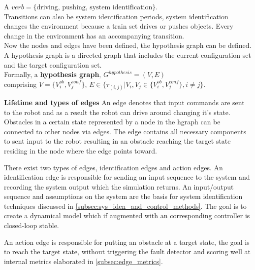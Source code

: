 A $verb = \{\textrm{driving, pushing, system identification}\}$.\\

Transitions can also be system identification periods, system identification changes the environment because a train set drives or pushes objects. Every change in the environment has an accompanying transition.\\

Now the nodes and edges have been defined, the hypothesis graph can be defined. A hypothesis graph is a directed graph that includes the current configuration set and the target configuration set. \\
Formally, a \textbf{hypothesis graph}, $G^{hypothesis} = (V, E)$ 
\\comprising $V = \{V^{ob}_{i}, V^{conf}_{j}\}$, $E \in \{\tau_{(i,j)}| V_i, V_j \in \{V^{ob}_{i}, V^{conf}_{j}\}, i \neq j\}$.\\





\textbf{Lifetime and types of edges}
\newline
An edge denotes that input commands are sent to the robot and as a result the robot can drive around changing it's state. Obstacles in a certain state represented by a node in the hgraph can be connected to other nodes via edges.
The edge contains all necessary components to sent input to the robot resulting in an obstacle reaching the target state residing in the node where the edge points toward. \vspace{\baselineskip}

There exist two types of edges, identification edges and action edges. An identification edge is responsible for sending an input sequence to the system and recording the system output which the simulation returns. An input/output sequence and assumptions on the system are the basis for system identification techniques discussed in \cref{subsec:sys_iden_and_control_methods}. The goal is to create a dynamical model which if augmented with an corresponding controller is closed-loop stable. \vspace{\baselineskip}

An action edge is responsible for putting an obstacle at a target state, the goal is to reach the target state, without triggering the fault detector and scoring well at internal metrics elaborated in \cref{subsec:edge_metrics}.

